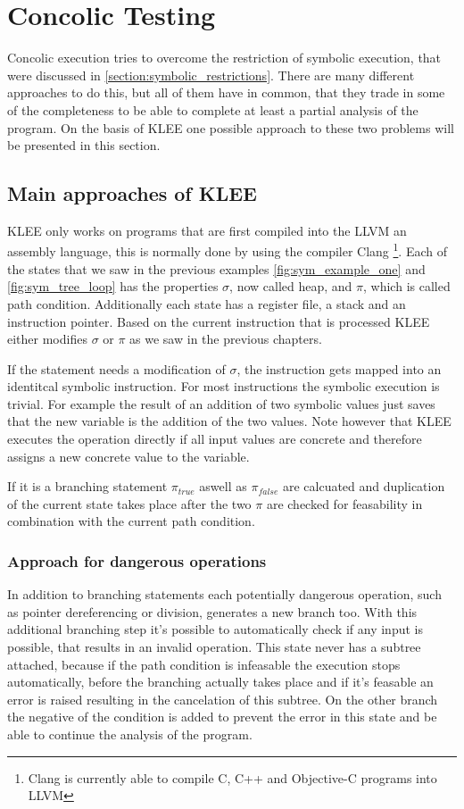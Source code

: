 \section{Concolic Testing} \label{section:concolic_testing}
Concolic execution tries to overcome the restriction of symbolic execution, that were discussed in \ref{section:symbolic_restrictions}. There are many different approaches to do this, but all of them have in common, that they trade in some of the completeness to be able to complete at least a partial analysis of the program.
On the basis of KLEE \cite{Cadar:2008:KUA:1855741.1855756} one possible approach to these two problems will be presented in this section.

\subsection{Main approaches of KLEE}
KLEE only works on programs that are first compiled into the LLVM an assembly language, this is normally done by using the compiler Clang \footnote{Clang is currently able to compile C, C++  and Objective-C programs into LLVM}. 
Each of the states that we saw in the previous examples \ref{fig:sym_example_one} and \ref{fig:sym_tree_loop} has the properties $\sigma$, now called heap, and $\pi$, which is called path condition. Additionally each state has a register file, a stack and an instruction pointer. Based on the current instruction that is processed KLEE either modifies $\sigma$ or $\pi$ as we saw in the previous chapters.

If the statement needs a modification of $\sigma$, the instruction gets mapped into an identitcal symbolic instruction. For most instructions the symbolic execution is trivial. For example the result of an addition of two symbolic values just saves that the new variable is the addition of the two values. Note however that KLEE executes the operation directly if all input values are concrete and therefore assigns a new concrete value to the variable.

If it is a branching statement $\pi_{true}$ aswell as $\pi_{false}$ are calcuated and duplication of the current state takes place after the two $\pi$ are checked for feasability in combination with the current path condition.

\subsubsection{Approach for dangerous operations}
In addition to branching statements each potentially dangerous operation, such as pointer dereferencing or division, generates a new branch too. With this additional branching step it's possible to automatically check if any input is possible, that results in an invalid operation. This state never has a subtree attached, because if the path condition is infeasable the execution stops automatically, before the branching actually takes place and if it's feasable an error is raised resulting in the cancelation of this subtree. On the other branch the negative of the condition is added to prevent the error in this state and be able to continue the analysis of the program.

